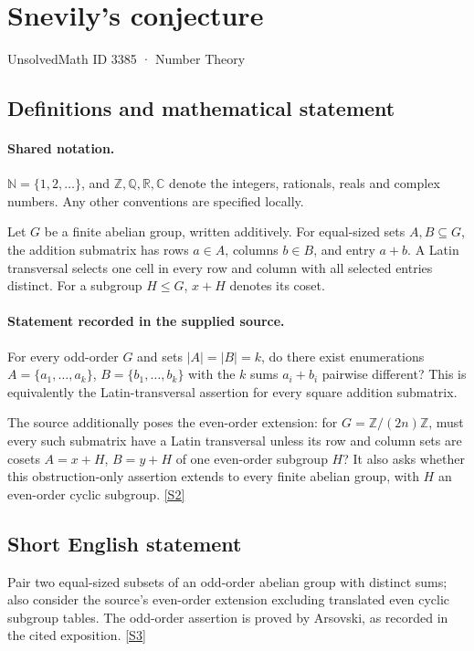 \documentclass[11pt]{article}
\newcommand{\sref}[2]{\hyperlink{source:#1:#2}{[S#2]}}
\begin{document}
\setcounter{section}{3384}
\section{Snevily's conjecture}\label{3385}
{\small\sffamily UnsolvedMath ID 3385 · Number Theory}
\subsection{Definitions and mathematical statement}

\paragraph{Shared notation.}$\mathbb N=\{1,2,\ldots\}$, and $\mathbb Z,\mathbb Q,\mathbb R,\mathbb C$ denote the integers, rationals, reals and complex numbers. Any other conventions are specified locally.


Let $G$ be a finite abelian group, written additively. For equal-sized sets $A,B\subseteq G$, the addition submatrix has rows $a\in A$, columns $b\in B$, and entry $a+b$. A Latin transversal selects one cell in every row and column with all selected entries distinct. For a subgroup $H\le G$, $x+H$ denotes its coset.
\paragraph{Statement recorded in the supplied source.}
For every odd-order $G$ and sets $|A|=|B|=k$, do there exist enumerations $A=\{a_1,\ldots,a_k\}$, $B=\{b_1,\ldots,b_k\}$ with the $k$ sums $a_i+b_i$ pairwise different? This is equivalently the Latin-transversal assertion for every square addition submatrix.

The source additionally poses the even-order extension: for $G=\mathbb Z/(2n)\mathbb Z$, must every such submatrix have a Latin transversal unless its row and column sets are cosets $A=x+H$, $B=y+H$ of one even-order subgroup $H$? It also asks whether this obstruction-only assertion extends to every finite abelian group, with $H$ an even-order cyclic subgroup. \sref{3385}{2}
\subsection{Short English statement}
Pair two equal-sized subsets of an odd-order abelian group with distinct sums; also consider the source’s even-order extension excluding translated even cyclic subgroup tables. The odd-order assertion is proved by Arsovski, as recorded in the cited exposition. \sref{3385}{3}
\end{document}
